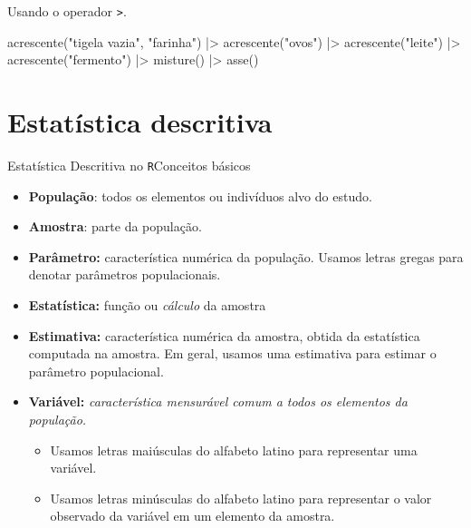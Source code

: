 \documentclass[
  10pt,
  ignorenonframetext,
]{beamer}
\newenvironment{Shaded}{\begin{snugshade}}{\end{snugshade}}
\newcommand{\FunctionTok}[1]{\textcolor[rgb]{0.28,0.35,0.67}{#1}}
\newcommand{\NormalTok}[1]{\textcolor[rgb]{0.00,0.23,0.31}{#1}}
\newcommand{\SpecialCharTok}[1]{\textcolor[rgb]{0.37,0.37,0.37}{#1}}
\newcommand{\StringTok}[1]{\textcolor[rgb]{0.13,0.47,0.30}{#1}}
\providecommand{\tightlist}{%
  \setlength{\itemsep}{0pt}\setlength{\parskip}{0pt}}\usepackage{longtable,booktabs,array}
\begin{document}
\begin{frame}[fragile]
Usando o operador \texttt{\textbar{}\textgreater{}}.

\vspace{0.5cm}

\begin{Shaded}
\begin{Highlighting}[]
\FunctionTok{acrescente}\NormalTok{(}\StringTok{"tigela vazia"}\NormalTok{, }\StringTok{"farinha"}\NormalTok{) }\SpecialCharTok{|\textgreater{}}
  \FunctionTok{acrescente}\NormalTok{(}\StringTok{"ovos"}\NormalTok{) }\SpecialCharTok{|\textgreater{}}
  \FunctionTok{acrescente}\NormalTok{(}\StringTok{"leite"}\NormalTok{) }\SpecialCharTok{|\textgreater{}}
  \FunctionTok{acrescente}\NormalTok{(}\StringTok{"fermento"}\NormalTok{) }\SpecialCharTok{|\textgreater{}}
  \FunctionTok{misture}\NormalTok{() }\SpecialCharTok{|\textgreater{}}
  \FunctionTok{asse}\NormalTok{()}
\end{Highlighting}
\end{Shaded}
\end{frame}

\hypertarget{estatuxedstica-descritiva}{%
\section{Estatística descritiva}\label{estatuxedstica-descritiva}}

\begin{frame}{Estatística Descritiva no \texttt{R}\newline Conceitos
básicos}
\protect\hypertarget{estatuxedstica-descritiva-no-rconceitos-buxe1sicos}{}
\begin{itemize}
\tightlist
\item
  \textbf{População}: todos os elementos ou indivíduos alvo do estudo.
\item
  \textbf{Amostra}: parte da população.
\item
  \textbf{Parâmetro:} característica numérica da população. Usamos
  letras gregas para denotar parâmetros populacionais.
\item
  \textbf{Estatística:} função ou \emph{cálculo} da amostra
\item
  \textbf{Estimativa:} característica numérica da amostra, obtida da
  estatística computada na amostra. Em geral, usamos uma estimativa para
  estimar o parâmetro populacional.
\item
  \textbf{Variável:} \emph{característica mensurável comum a todos os
  elementos da população.}

  \begin{itemize}
  \tightlist
  \item
    Usamos letras maiúsculas do alfabeto latino para representar uma
    variável.
  \item
    Usamos letras minúsculas do alfabeto latino para representar o valor
    observado da variável em um elemento da amostra.
  \end{itemize}
\end{itemize}
\end{frame}
\end{document}
